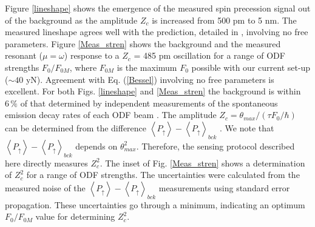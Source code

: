 \documentclass[aps,prl,twocolumn,superscriptaddress,floatfix]{revtex4-1}
\begin{document}
Figure \ref{lineshape} shows the emergence of the measured spin precession signal out of the background as the amplitude $Z_c$ is increased from 500 pm to 5 nm. The measured lineshape agrees well with the prediction, detailed in \citep{SuppMat}, involving no free parameters. Figure \ref{Meas_stren} shows the background and the measured resonant ($\mu=\omega$) response to a $Z_c$ = 485 pm oscillation for a range of ODF strengths $F_{0}/F_{0M}$, where $F_{0M}$ is the maximum $F_0$ possible with our current set-up ($\sim 40$ yN). Agreement with Eq. (\ref{Bessel}) involving no free parameters is excellent. For both Figs. \ref{lineshape} and \ref{Meas_stren} the background is within $6\,\%$ of that determined by independent measurements of the spontaneous emission decay rates of each ODF beam \citep{Britton2012}. The amplitude $Z_c=\theta_{max}/(\tau F_{0}/\hbar)$ can be determined from the difference $\left< P_\uparrow \right>- \left< P_\uparrow \right>_{bck}$ \citep{SuppMat}. We note that $\left< P_\uparrow \right>- \left< P_\uparrow \right>_{bck}$ depends on $\theta_{max}^2$. Therefore, the sensing protocol described here directly measures $Z_c^2$. The inset of Fig. \ref{Meas_stren} shows a determination of $Z_c^2$ for a range of ODF strengths. The uncertainties were calculated from the measured noise of the $\left< P_\uparrow \right>- \left< P_\uparrow \right>_{bck}$ measurements using standard error propagation. These uncertainties go through a minimum, indicating an optimum $F_{0}/F_{0M}$ value for determining $Z_c^2$.
\end{document}

